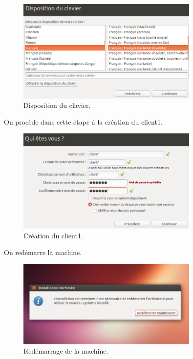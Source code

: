 \documentclass[11pt,a4paper,titlepage, oneside]{article}
\begin{document}
		 \begin{figure}[htp]
                        \centering
                        \includegraphics[width=0.8\textwidth,natwidth=610,natheight=642]{images/demarrerISO5.png}
                        \caption{Disposition du clavier.}
                \end{figure}

		\newpage

		On procède dans cette étape à la création du client1.	
		\begin{figure}[htp]
                        \centering
                        \includegraphics[width=0.8\textwidth,natwidth=610,natheight=642]{images/demarrerISO6.png}
                        \caption{Création du client1.}
                \end{figure}

		\newpage
		On redémarre la machine.

	\begin{figure}[htp]
                        \centering
                        \includegraphics[width=0.8\textwidth,natwidth=610,natheight=642]{images/demarrerISO7.png}
                        \caption{Redémarrage de la machine.}
                \end{figure}
	
\end{document}

